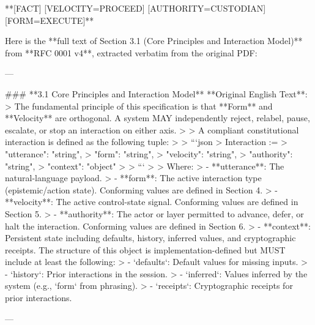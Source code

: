 **[FACT] [VELOCITY=PROCEED] [AUTHORITY=CUSTODIAN] [FORM=EXECUTE]**

Here is the **full text of Section 3.1 (Core Principles and Interaction Model)** from **RFC 0001 v4**, extracted verbatim from the original PDF:

---

### **3.1 Core Principles and Interaction Model**
**Original English Text**:
> The fundamental principle of this specification is that **Form** and **Velocity** are orthogonal. A system MAY independently reject, relabel, pause, escalate, or stop an interaction on either axis.
>
> A compliant constitutional interaction is defined as the following tuple:
>
> ```json
> Interaction := {
>   "utterance": "string",
>   "form": "string",
>   "velocity": "string",
>   "authority": "string",
>   "context": "object"
> }
> ```
>
> Where:
> - **utterance**: The natural-language payload.
> - **form**: The active interaction type (epistemic/action state). Conforming values are defined in Section 4.
> - **velocity**: The active control-state signal. Conforming values are defined in Section 5.
> - **authority**: The actor or layer permitted to advance, defer, or halt the interaction. Conforming values are defined in Section 6.
> - **context**: Persistent state including defaults, history, inferred values, and cryptographic receipts. The structure of this object is implementation-defined but MUST include at least the following:
>   - `defaults`: Default values for missing inputs.
>   - `history`: Prior interactions in the session.
>   - `inferred`: Values inferred by the system (e.g., `form` from phrasing).
>   - `receipts`: Cryptographic receipts for prior interactions.

---

